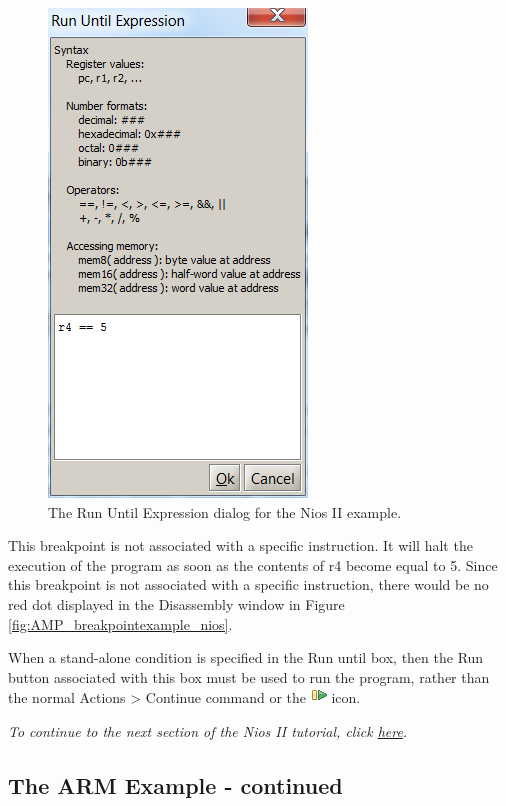 \documentclass[11pt, twoside, pdftex]{article}
\begin{document}
\begin{figure}[H]
   \begin{center}
      \includegraphics[scale=1]{screenshots/figure29.png}
   \end{center}
   \caption{The Run Until Expression dialog for the Nios II example.} 
   \label{fig:AMP_rununtilexpression_nios}
\end{figure}

This breakpoint is not associated with a specific instruction. It
will halt the execution of the program as soon as the contents
of r4 become equal to 5.
Since this breakpoint is not associated with a specific
instruction, there would be no red dot displayed in the
Disassembly window in Figure \ref{fig:AMP_breakpointexample_nios}. 

When a stand-alone condition is specified in the {\sf Run until}
box, then the Run button associated with this box must be used to
run the program, rather than the normal {\sf Actions > Continue} command or the \includegraphics{toolbar/continue.png} icon.   

{\it To continue to the next section of the Nios II tutorial, click \hyperref[tut:nios_5]{here}.}

\newpage
\subsection{The ARM Example - continued}
\label{tut:arm_3}
\end{document}
